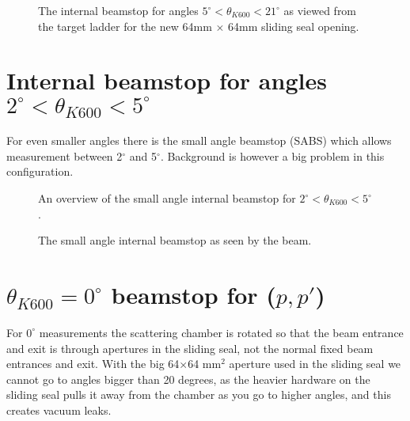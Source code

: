 \documentclass[11pt]{report}
\begin{document}
\begin{figure}[!ht]
\centerline{\vspace{0cm}\hspace{0cm}
}
\centering
\caption{The internal beamstop for angles $5^{\circ}<\theta_{K600}<21^{\circ}$
 as viewed from the target ladder for the new 64mm $\times$ 64mm sliding seal opening. }
\label{fig:scatcham-beamstop-64x64hole}
\end{figure} 


\section{Internal beamstop for angles $2^{\circ}<\theta_{K600}<5^{\circ}$ }

For even smaller angles there is the small angle beamstop (SABS) which  allows measurement between 2$^{\circ}$ and 5$^{\circ}$.  Background is however a big problem in this configuration.


\begin{figure}[!ht]
\centerline{\vspace{0cm}\hspace{0cm}
}
\centering
\caption{An overview of the small angle internal beamstop for $2^{\circ}<\theta_{K600}<5^{\circ}$.}
\label{fig:smallangle-beamstop-1}
\end{figure} 

\begin{figure}[!ht]
\centerline{\vspace{0cm}\hspace{0cm}
}
\centering
\caption{The small angle internal beamstop as seen by the beam.}
\label{fig:smallangle-beamstop-2}
\end{figure} 





\section{$\theta_{K600}=0^{\circ}$ beamstop for ($p,p'$)}

For $0^{\circ}$ measurements the scattering chamber is rotated so that the beam entrance
and exit is through apertures in the sliding seal, not the normal fixed beam entrances and
exit.  With the big 64$\times$64 mm$^2$ aperture used in the sliding seal we cannot go to angles
bigger than 20 degrees, as the heavier hardware on the sliding seal pulls it away from the
chamber as you go to higher angles, and this creates vacuum leaks.
\end{document}
